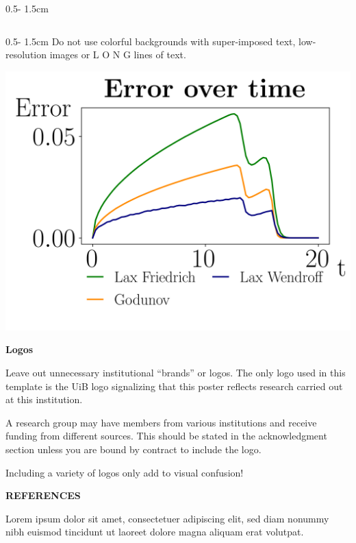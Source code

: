 \documentclass{uibposter}
\begin{document}
\begin{frame}[fragile]
\begin{columns}
\begin{column}{0.5\textwidth - 1.5cm}
\begin{column}{0.5\textwidth - 1.5cm}
    Do not use colorful backgrounds with super-imposed text, low-resolution images or L O N G lines of text.
        \vspace{1.5cm}
        
    \vspace{1.5cm}
    
    \includegraphics{fig/error_over_time.png}

    \textbf{Logos}
    
    Leave out unnecessary institutional “brands” or logos. The only logo used in this template is the UiB logo signalizing that this poster reflects research carried out at this institution.
\vspace{0.2cm}

    A research group may have members from various institutions and receive funding from different sources. This should be stated in the acknowledgment section unless you are bound by contract to include the logo. 
\vspace{0.2cm}

    Including a variety of logos only add to visual confusion!
    \vspace{5cm}
    
    {\scriptsize
    \textbf{REFERENCES}

    Lorem ipsum dolor sit amet, consectetuer adipiscing elit, sed diam nonummy nibh euismod tincidunt ut laoreet dolore magna aliquam erat volutpat. 

}
\end{column}
\end{column}
\end{columns}
\end{frame}
\end{document}
